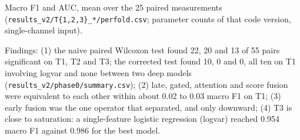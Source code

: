 \documentclass[11pt,a4paper]{article}
\newcounter{none} %
\begin{document}
Macro F1 and AUC, mean over the 25 paired measurements (\nolinkurl{results_v2/T{1,2,3}_*/perfold.csv};
parameter counts of that code version, single-channel input).

Findings: (1) the naive paired Wilcoxon test found 22, 20 and 13 of 55 pairs significant
on T1, T2 and T3; the corrected test found 10, 0 and 0, all ten on T1 involving logvar
and none between two deep models (\nolinkurl{results_v2/phase0/summary.csv}); (2) late, gated,
attention and score fusion were equivalent to each other within about 0.02 to 0.03
macro F1 on T1; (3) early fusion was the one operator that separated, and only
downward; (4) T3 is close to saturation: a single-feature logistic regression (logvar)
reached 0.954 macro F1 against 0.986 for the best model.
\end{document}
